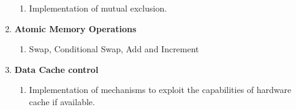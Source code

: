 \begin{enumerate}
\begin{enumerate}
\item Implementation of mutual exclusion.
\end{enumerate}
\item \textbf{Atomic Memory Operations}

\begin{enumerate}
\item Swap, Conditional Swap, Add and Increment 
\end{enumerate}
\item \textbf{Data Cache control}

\begin{enumerate}
\item Implementation of mechanisms to exploit the capabilities of hardware
cache if available.
\end{enumerate}
\end{enumerate}
